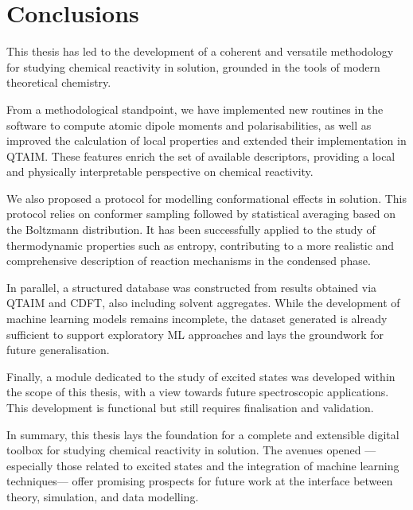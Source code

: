 \chapter{Conclusions}

This thesis has led to the development of a coherent and versatile
methodology for studying chemical reactivity in solution, grounded in the
tools of modern theoretical chemistry.

From a methodological standpoint, we have implemented new routines in the \ams
software to compute atomic dipole moments and polarisabilities, as well
as improved the calculation of local properties and extended their
implementation in QTAIM. These features enrich the set of available
descriptors, providing a local and physically interpretable perspective on
chemical reactivity.

We also proposed a protocol for modelling conformational effects
in solution. This protocol relies on conformer sampling followed
by statistical averaging based on the Boltzmann distribution. It has been
successfully applied to the study of thermodynamic properties such as entropy,
contributing to a more realistic and comprehensive description of reaction
mechanisms in the condensed phase.

In parallel, a structured database was constructed from results obtained via
\gls{QTAIM} and \gls{CDFT}, also including solvent aggregates. While the
development of machine learning models remains incomplete, the dataset
generated is already sufficient to support exploratory ML approaches and lays
the groundwork for future generalisation.

\newpage
Finally, a module dedicated to the study of excited states was developed
within the scope of this thesis, with a view towards future spectroscopic
applications. This development is functional but still requires finalisation
and validation.

In summary, this thesis lays the foundation for a complete and extensible
digital toolbox for studying chemical reactivity in solution. The avenues
opened ---especially those related to excited states and the integration of
machine learning techniques--- offer promising prospects for future work at the
interface between theory, simulation, and data modelling.

